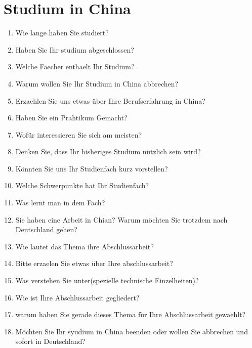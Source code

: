 \documentclass[b5paper, twoside]{ctexbook}
\begin{document}
\section{Studium in China}
\begin{enumerate}
  \item Wie lange haben Sie studiert?
  \item Haben Sie Ihr studium abgeschlossen?
  \item Welche Faecher enthaelt Ihr Studium?
  \item Warum wollen Sie Ihr Studium in China abbrechen?
  \item Erzaehlen Sie uns etwas \"uber Ihre Berufserfahrung in China?
  \item Haben Sie ein Prahtikum Gemacht?
  \item Wof\"ur interessieren Sie sich am meisten?
  \item Denken Sie, dass Ihr bisheriges Studium n\"utzlich sein wird?
  \item K\"onnten Sie uns Ihr Studienfach kurz vorstellen?
  \item Welche Schwerpunkte hat Ihr Studienfach?
  \item Was lernt man in dem Fach?
  \item Sie haben eine Arbeit in Chian? Warum m\"ochten Sie trotzdem nach Deutschland gehen?
  \item Wie lautet das Thema ihre Abschlussarbeit?
  \item Bitte erzaelen Sie etwas \"uber Ihre abschlussarbeit?
  \item Was verstehen Sie unter(spezielle technische Einzelheiten)?
  \item Wie ist Ihre Abschlussarbeit gegliedert?
  \item warum haben Sie gerade dieses Thema f\"ur Ihre Abschlussarbeit gewaehlt?
  \item M\"ochten Sie Ihr syudium in China beenden oder wollen Sie abbrechen und sofort in Deutschland?
\end{enumerate}
\end{document}
